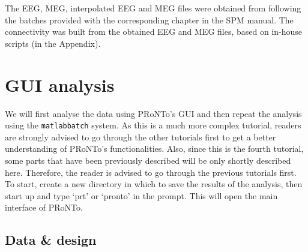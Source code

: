 The EEG, MEG, interpolated EEG and MEG files were obtained from following the batches provided with the corresponding chapter in the SPM manual. The connectivity was built from the obtained EEG and MEG files, based on in-house scripts (in the Appendix).



\section{GUI analysis}

We will first analyse the data using PRoNTo's GUI and then repeat the analysis using the {\tt matlabbatch} system. As this is a much more complex tutorial, readers are strongly advised to go through the other tutorials first to get a better understanding of PRoNTo's functionalities. Also, since this is the fourth tutorial, some parts that have been previously described will be only shortly described here. Therefore, the reader is advised to go through the previous tutorials first.
\\

To start, create a new directory in which to save the results of the analysis, then start up \matlab{} and type `prt' or `pronto' in the \matlab{} prompt. This will open the main interface of PRoNTo.

\subsection{Data \& design}

